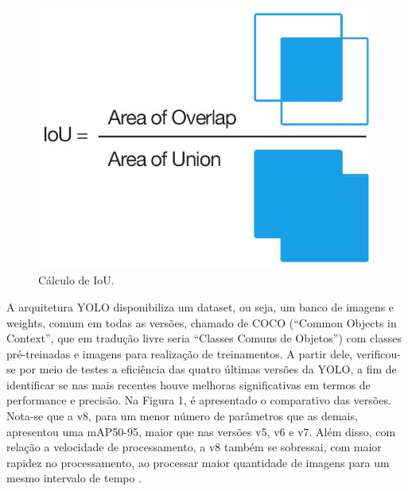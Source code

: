 \begin{figure}[!h]
    \center
    \begin{minipage}{0.6\linewidth}
    \center
    \captionsetup{justification=centering,margin=0.5cm,font=small}
    \includegraphics[width=0.7\linewidth]{img/cap2/iou.png}
    \caption{ Cálculo de IoU. \cite{padilla2020survey}} \label{subfig:iou}
    \end{minipage}
\end{figure}

A arquitetura YOLO disponibiliza um dataset, ou seja, um banco de imagens e weights, comum em todas as versões, chamado de COCO (“Common Objects in Context”, que em tradução livre seria “Classes Comuns de Objetos”) com classes pré-treinadas e imagens para realização de treinamentos. A partir dele, verificou-se por meio de testes a eficiência das quatro últimas versões da YOLO, a fim de identificar se nas mais recentes houve melhoras significativas em termos de performance e precisão. Na Figura 1, é apresentado o comparativo das versões. Nota-se que a v8, para um menor número de parâmetros que as demais, apresentou uma mAP50-95, maior que nas versões v5, v6 e v7. Além disso, com relação a velocidade de processamento, a v8 também se sobressai, com maior rapidez no processamento, ao processar maior quantidade de imagens para um mesmo intervalo de tempo \cite{padilla2020survey}.


